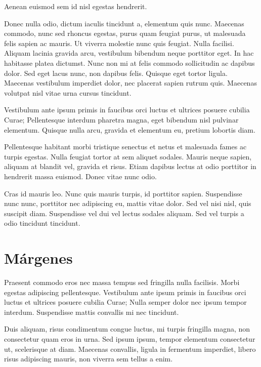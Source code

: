 \documentclass[12pt,a4paper]{report}
\begin{document}
Aenean euismod sem id nisl egestas hendrerit.

Donec nulla odio, dictum iaculis tincidunt a, elementum quis nunc. Maecenas commodo, nunc sed rhoncus egestas, purus quam feugiat purus, ut malesuada felis sapien ac mauris. Ut viverra molestie nunc quis feugiat. Nulla facilisi. Aliquam lacinia gravida arcu, vestibulum bibendum neque porttitor eget. In hac habitasse platea dictumst. Nunc non mi at felis commodo sollicitudin ac dapibus dolor. Sed eget lacus nunc, non dapibus felis. Quisque eget tortor ligula. Maecenas vestibulum imperdiet dolor, nec placerat sapien rutrum quis. Maecenas volutpat nisl vitae urna cursus tincidunt. 

Vestibulum ante ipsum primis in faucibus orci luctus et ultrices posuere cubilia Curae; Pellentesque interdum pharetra magna, eget bibendum nisl pulvinar elementum. Quisque nulla arcu, gravida et elementum eu, pretium lobortis diam.

Pellentesque habitant morbi tristique senectus et netus et malesuada fames ac turpis egestas. Nulla feugiat tortor at sem aliquet sodales. Mauris neque sapien, aliquam at blandit vel, gravida et risus. Etiam dapibus lectus at odio porttitor in hendrerit massa euismod. Donec vitae nunc odio. 

Cras id mauris leo. Nunc quis mauris turpis, id porttitor sapien. Suspendisse nunc nunc, porttitor nec adipiscing eu, mattis vitae dolor. Sed vel nisi nisl, quis suscipit diam. Suspendisse vel dui vel lectus sodales aliquam. Sed vel turpis a odio tincidunt tincidunt.




\section{Márgenes}
\label{seccion.margenes}



Praesent commodo eros nec massa tempus sed fringilla nulla facilisis. Morbi egestas adipiscing pellentesque. Vestibulum ante ipsum primis in faucibus orci luctus et ultrices posuere cubilia Curae; Nulla semper dolor nec ipsum tempor interdum. Suspendisse mattis convallis mi nec tincidunt. 

Duis aliquam, risus condimentum congue luctus, mi turpis fringilla magna, non consectetur quam eros in urna. Sed ipsum ipsum, tempor elementum consectetur ut, scelerisque at diam. Maecenas convallis, ligula in fermentum imperdiet, libero risus adipiscing mauris, non viverra sem tellus a enim.
\end{document}
